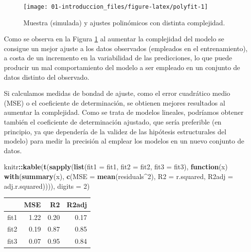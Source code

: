 \documentclass[
]{book}
\newenvironment{Shaded}{\begin{snugshade}}{\end{snugshade}}
\newcommand{\ControlFlowTok}[1]{\textcolor[rgb]{0.13,0.29,0.53}{\textbf{#1}}}
\newcommand{\DataTypeTok}[1]{\textcolor[rgb]{0.13,0.29,0.53}{#1}}
\newcommand{\DecValTok}[1]{\textcolor[rgb]{0.00,0.00,0.81}{#1}}
\newcommand{\KeywordTok}[1]{\textcolor[rgb]{0.13,0.29,0.53}{\textbf{#1}}}
\newcommand{\NormalTok}[1]{#1}
\newcommand{\OperatorTok}[1]{\textcolor[rgb]{0.81,0.36,0.00}{\textbf{#1}}}
\theoremstyle{break}
\theoremstyle{definition}
\theoremstyle{definition}
\theoremstyle{definition}
\theoremstyle{remark}
\begin{document}
\begin{figure}[!htb]

{\centering \texttt{[image: 01-introduccion\_files/figure-latex/polyfit-1]} 

}

\caption{Muestra (simulada) y ajustes polinómicos con distinta complejidad.}\label{fig:polyfit}
\end{figure}

Como se observa en la Figura \ref{fig:polyfit} al aumentar la complejidad del modelo se consigue un mejor ajuste a los datos observados (empleados en el entrenamiento), a costa de un incremento en la variabilidad de las predicciones, lo que puede producir un mal comportamiento del modelo a ser empleado en un conjunto de datos distinto del observado.

Si calculamos medidas de bondad de ajuste, como el error cuadrático medio (MSE) o el coeficiente de determinación, se obtienen mejores resultados al aumentar la complejidad.
Como se trata de modelos lineales, podríamos obtener también el coeficiente de determinación ajustado, que sería preferible (en principio, ya que dependería de la validez de las hipótesis estructurales del modelo) para medir la precisión al emplear los modelos en un nuevo conjunto de datos.

\begin{Shaded}
\begin{Highlighting}[]
\NormalTok{knitr}\OperatorTok{::}\KeywordTok{kable}\NormalTok{(}\KeywordTok{t}\NormalTok{(}\KeywordTok{sapply}\NormalTok{(}\KeywordTok{list}\NormalTok{(}\DataTypeTok{fit1 =}\NormalTok{ fit1, }\DataTypeTok{fit2 =}\NormalTok{ fit2, }\DataTypeTok{fit3 =}\NormalTok{ fit3), }
       \ControlFlowTok{function}\NormalTok{(x) }\KeywordTok{with}\NormalTok{(}\KeywordTok{summary}\NormalTok{(x), }
                        \KeywordTok{c}\NormalTok{(}\DataTypeTok{MSE =} \KeywordTok{mean}\NormalTok{(residuals}\OperatorTok{^}\DecValTok{2}\NormalTok{), }\DataTypeTok{R2 =}\NormalTok{ r.squared, }\DataTypeTok{R2adj =}\NormalTok{ adj.r.squared)))), }\DataTypeTok{digits =} \DecValTok{2}\NormalTok{)}
\end{Highlighting}
\end{Shaded}

\begin{tabular}{l|r|r|r}
\hline
  & MSE & R2 & R2adj\\
\hline
fit1 & 1.22 & 0.20 & 0.17\\
\hline
fit2 & 0.19 & 0.87 & 0.85\\
\hline
fit3 & 0.07 & 0.95 & 0.84\\
\hline
\end{tabular}
\end{document}

